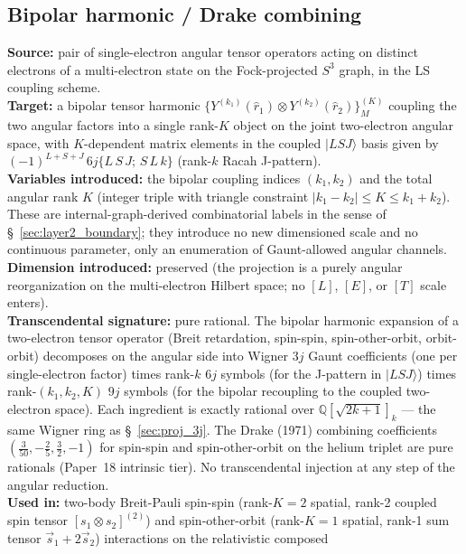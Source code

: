 \subsection{Bipolar harmonic / Drake combining}
\label{sec:proj_bipolar_drake}
\textbf{Source:} pair of single-electron angular tensor operators
acting on distinct electrons of a multi-electron state on the
Fock-projected $S^3$ graph, in the LS coupling scheme.\\
\textbf{Target:} a bipolar tensor harmonic
$\{Y^{(k_1)}(\hat r_1) \otimes Y^{(k_2)}(\hat r_2)\}^{(K)}_M$
coupling the two angular factors into a single rank-$K$ object
on the joint two-electron angular space, with $K$-dependent
matrix elements in the coupled $|LSJ\rangle$ basis given by
$(-1)^{L+S+J}\,6j\{L\,S\,J;\,S\,L\,k\}$ (rank-$k$ Racah J-pattern).\\
\textbf{Variables introduced:} the bipolar coupling indices
$(k_1, k_2)$ and the total angular rank $K$ (integer triple with
triangle constraint $|k_1 - k_2| \le K \le k_1 + k_2$).  These are
internal-graph-derived combinatorial labels in the sense of
\S~\ref{sec:layer2_boundary}; they introduce no new dimensioned
scale and no continuous parameter, only an enumeration of
Gaunt-allowed angular channels.\\
\textbf{Dimension introduced:} preserved (the projection is a
purely angular reorganization on the multi-electron Hilbert
space; no $[L]$, $[E]$, or $[T]$ scale enters).\\
\textbf{Transcendental signature:} pure rational.  The bipolar
harmonic expansion of a two-electron tensor operator (Breit
retardation, spin-spin, spin-other-orbit, orbit-orbit) decomposes
on the angular side into Wigner $3j$ Gaunt coefficients (one per
single-electron factor) times rank-$k$ $6j$ symbols (for the
J-pattern in $|LSJ\rangle$) times rank-$(k_1, k_2, K)$ $9j$
symbols (for the bipolar recoupling to the coupled
two-electron space).  Each ingredient is exactly rational over
$\mathbb{Q}[\sqrt{2k+1}]_{k}$ --- the same Wigner ring as
\S~\ref{sec:proj_3j}.  The Drake (1971) combining coefficients
$(\tfrac{3}{50}, -\tfrac{2}{5}, \tfrac{3}{2}, -1)$ for spin-spin
and spin-other-orbit on the helium triplet are pure rationals
(Paper~18 intrinsic tier).  No transcendental injection at any
step of the angular reduction.\\
\textbf{Used in:} two-body Breit-Pauli spin-spin (rank-$K{=}2$
spatial, rank-2 coupled spin tensor $[s_1 \otimes s_2]^{(2)}$) and
spin-other-orbit (rank-$K{=}1$ spatial, rank-1 sum tensor
$\vec s_1 + 2\vec s_2$) interactions on the relativistic composed
